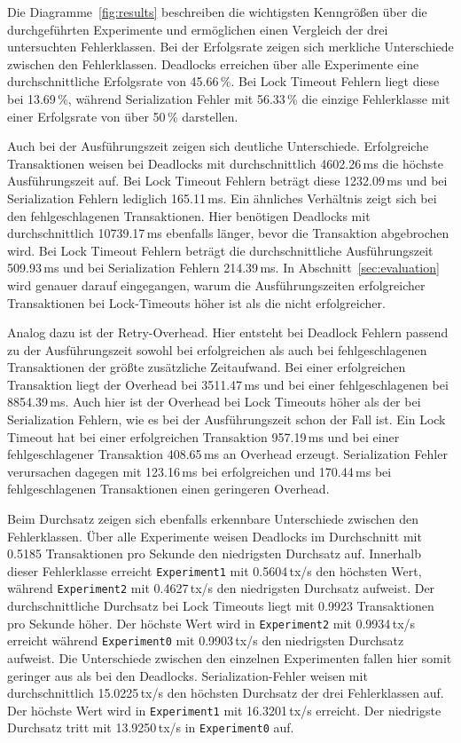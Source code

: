 
Die Diagramme~\ref{fig:results} beschreiben die wichtigsten Kenngrößen über die durchgeführten Experimente und
ermöglichen einen Vergleich der drei untersuchten Fehlerklassen.
Bei der Erfolgsrate zeigen sich merkliche Unterschiede zwischen den Fehlerklassen.
Deadlocks erreichen über alle Experimente eine durchschnittliche Erfolgsrate von 45.66\,\%.
Bei Lock Timeout Fehlern liegt diese bei 13.69\,\%, während Serialization Fehler mit 56.33\,\% die einzige Fehlerklasse
mit einer Erfolgsrate von über 50\,\% darstellen.

Auch bei der Ausführungszeit zeigen sich deutliche Unterschiede.
Erfolgreiche Transaktionen weisen bei Deadlocks mit durchschnittlich 4602.26\,ms die höchste Ausführungszeit auf.
Bei Lock Timeout Fehlern beträgt diese 1232.09\,ms und bei Serialization Fehlern lediglich 165.11\,ms.
Ein ähnliches Verhältnis zeigt sich bei den fehlgeschlagenen Transaktionen.
Hier benötigen Deadlocks mit durchschnittlich 10739.17\,ms ebenfalls länger, bevor die Transaktion
abgebrochen wird.
Bei Lock Timeout Fehlern beträgt die durchschnittliche Ausführungszeit 509.93\,ms und bei Serialization Fehlern 214.39\,ms.
In Abschnitt~\ref{sec:evaluation} wird genauer darauf eingegangen, warum die Ausführungszeiten erfolgreicher
Transaktionen bei Lock-Timeouts höher ist als die nicht erfolgreicher.

Analog dazu ist der Retry-Overhead.
Hier entsteht bei Deadlock Fehlern passend zu der Ausführungszeit sowohl bei erfolgreichen als auch bei
fehlgeschlagenen Transaktionen der größte zusätzliche Zeitaufwand.
Bei einer erfolgreichen Transaktion liegt der Overhead bei 3511.47\,ms und bei einer fehlgeschlagenen bei 8854.39\,ms.
Auch hier ist der Overhead bei Lock Timeouts höher als der bei Serialization Fehlern, wie es bei der
Ausführungszeit schon der Fall ist.
Ein Lock Timeout hat bei einer erfolgreichen Transaktion 957.19\,ms und bei einer fehlgeschlagener Transaktion
408.65\,ms an Overhead erzeugt.
Serialization Fehler verursachen dagegen mit 123.16\,ms bei erfolgreichen und 170.44\,ms bei fehlgeschlagenen
Transaktionen einen geringeren Overhead.

Beim Durchsatz zeigen sich ebenfalls erkennbare Unterschiede zwischen den Fehlerklassen.
Über alle Experimente weisen Deadlocks im Durchschnitt mit 0.5185 Transaktionen pro Sekunde den
niedrigsten Durchsatz auf.
Innerhalb dieser Fehlerklasse erreicht \texttt{Experiment1} mit 0.5604\,tx/s den höchsten Wert, während
\texttt{Experiment2} mit 0.4627\,tx/s den niedrigsten Durchsatz aufweist.
Der durchschnittliche Durchsatz bei Lock Timeouts liegt mit 0.9923 Transaktionen pro Sekunde höher.
Der höchste Wert wird in \texttt{Experiment2} mit 0.9934\,tx/s erreicht während \texttt{Experiment0} mit 0.9903\,tx/s
den niedrigsten Durchsatz aufweist.
Die Unterschiede zwischen den einzelnen Experimenten fallen hier somit geringer aus als bei den Deadlocks.
Serialization-Fehler weisen mit durchschnittlich 15.0225\,tx/s den höchsten Durchsatz der drei Fehlerklassen auf.
Der höchste Wert wird in \texttt{Experiment1} mit 16.3201\,tx/s erreicht.
Der niedrigste Durchsatz tritt mit 13.9250\,tx/s in \texttt{Experiment0} auf.

